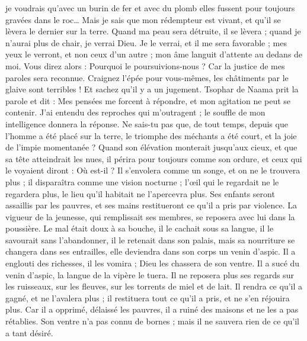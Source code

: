\begin{multicols}{2}
je voudrais qu'avec un burin de fer et avec du plomb elles fussent pour toujours gravées dans le roc…
Mais je sais que mon rédempteur est vivant, et qu'il se lèvera le dernier sur la terre.
Quand ma peau sera détruite, il se lèvera ; quand je n'aurai plus de chair, je verrai Dieu.
Je le verrai, et il me sera favorable ; mes yeux le verront, et non ceux d'un autre ; mon âme languit d'attente au dedans de moi.
Vous direz alors : Pourquoi le poursuivions-nous ? Car la justice de mes paroles sera reconnue.
Craignez l'épée pour vous-mêmes, les châtiments par le glaive sont terribles ! Et sachez qu'il y a un jugement.
\VerseOne{}Tsophar de Naama prit la parole et dit :
Mes pensées me forcent à répondre, et mon agitation ne peut se contenir.
J'ai entendu des reproches qui m'outragent ; le souffle de mon intelligence donnera la réponse.
Ne sais-tu pas que, de tout temps, depuis que l'homme a été placé sur la terre,
le triomphe des méchants a été court, et la joie de l'impie momentanée ?
Quand son élévation monterait jusqu'aux cieux, et que sa tête atteindrait les nues,
il périra pour toujours comme son ordure, et ceux qui le voyaient diront : Où est-il ?
Il s'envolera comme un songe, et on ne le trouvera plus ; il disparaîtra comme une vision nocturne ;
l'œil qui le regardait ne le regardera plus, le lieu qu'il habitait ne l'apercevra plus.
Ses enfants seront assaillis par les pauvres, et ses mains restitueront ce qu'il a pris par violence.
La vigueur de la jeunesse, qui remplissait ses membres, se reposera avec lui dans la poussière.
Le mal était doux à sa bouche, il le cachait sous sa langue,
il le savourait sans l'abandonner, il le retenait dans son palais,
mais sa nourriture se changera dans ses entrailles, elle deviendra dans son corps un venin d'aspic.
Il a englouti des richesses, il les vomira ; Dieu les chassera de son ventre.
Il a sucé du venin d'aspic, la langue de la vipère le tuera.
Il ne reposera plus ses regards sur les ruisseaux, sur les fleuves, sur les torrents de miel et de lait.
Il rendra ce qu'il a gagné, et ne l'avalera plus ; il restituera tout ce qu'il a pris, et ne s'en réjouira plus.
Car il a opprimé, délaissé les pauvres, il a ruiné des maisons et ne les a pas rétablies.
Son ventre n'a pas connu de bornes ; mais il ne sauvera rien de ce qu'il a tant désiré.

\end{multicols}
